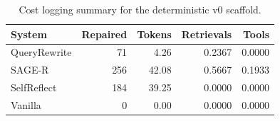 \begin{table}[t]
\centering
\scriptsize
\setlength{\tabcolsep}{3pt}
\begin{tabular}{lrrrr}
\toprule
System & Repaired & Tokens & Retrievals & Tools \\
\midrule
QueryRewrite & 71 & 4.26 & 0.2367 & 0.0000 \\
SAGE-R & 256 & 42.08 & 0.5667 & 0.1933 \\
SelfReflect & 184 & 39.25 & 0.0000 & 0.0000 \\
Vanilla & 0 & 0.00 & 0.0000 & 0.0000 \\
\bottomrule
\end{tabular}
\caption{Cost logging summary for the deterministic v0 scaffold.}
\label{tab:v0-cost}
\end{table}
